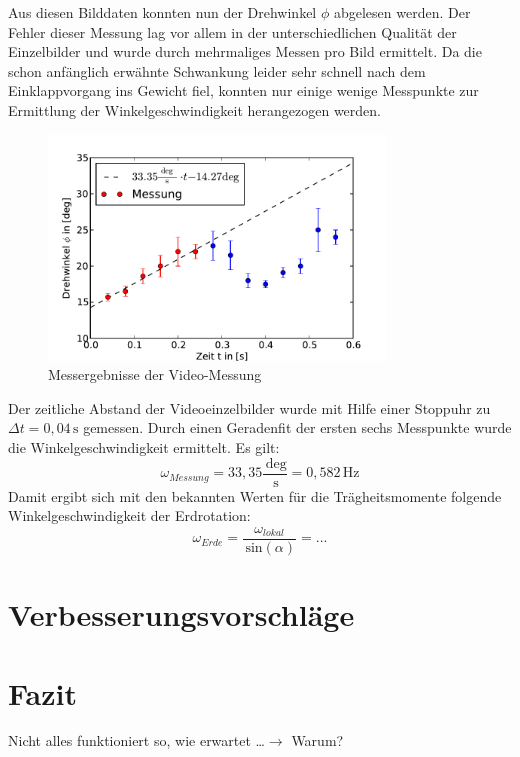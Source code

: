\documentclass[11pt]{scrartcl}
\newcommand{\unit}[1]{\ensuremath{\,\mathrm{#1}}} %
\begin{document}
Aus diesen Bilddaten konnten nun der Drehwinkel $\phi$ abgelesen werden. Der Fehler dieser Messung lag vor allem in der unterschiedlichen Qualität der Einzelbilder und wurde durch mehrmaliges Messen pro Bild ermittelt.
Da die schon anfänglich erwähnte Schwankung leider sehr schnell nach dem Einklappvorgang ins Gewicht fiel, konnten nur einige wenige Messpunkte zur Ermittlung der Winkelgeschwindigkeit herangezogen werden.
\begin{figure}[h]
\begin{center}
\includegraphics[width=0.8\textwidth]{images/messung_Video.pdf}
\end{center}
\vspace{-1.5\baselineskip}
\caption{Messergebnisse der Video-Messung}
\label{messung_Video}
\end{figure}
Der zeitliche Abstand der Videoeinzelbilder wurde mit Hilfe einer Stoppuhr zu $\Delta t = 0,04\unit{s}$ gemessen.
Durch einen Geradenfit der ersten sechs Messpunkte wurde die Winkelgeschwindigkeit ermittelt. Es gilt:
\[ \omega_{Messung} = 33,35 \frac{\unit{deg}}{\unit{s}} = 0,582 \unit{Hz} \]
Damit ergibt sich mit den bekannten Werten für die Trägheitsmomente folgende Winkelgeschwindigkeit der Erdrotation:
\[ \omega_{Erde} = \frac{\omega_{lokal}}{\unit{sin}(\alpha)} = ... \]


\section{Verbesserungsvorschläge} %


\section{Fazit} %
Nicht alles funktioniert so, wie erwartet \dots $\rightarrow$ Warum?
\end{document}
